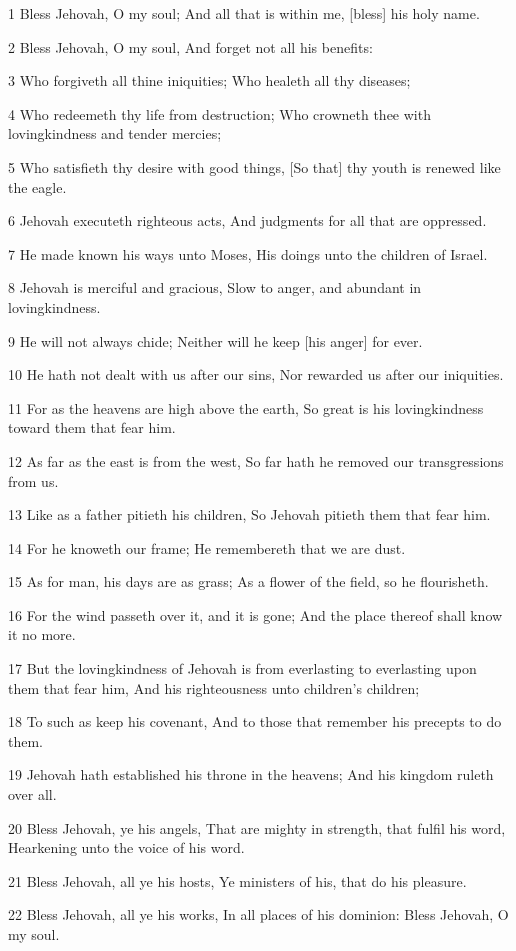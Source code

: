 \par 1 Bless Jehovah, O my soul; And all that is within me, [bless] his holy name.
\par 2 Bless Jehovah, O my soul, And forget not all his benefits:
\par 3 Who forgiveth all thine iniquities; Who healeth all thy diseases;
\par 4 Who redeemeth thy life from destruction; Who crowneth thee with lovingkindness and tender mercies;
\par 5 Who satisfieth thy desire with good things, [So that] thy youth is renewed like the eagle.
\par 6 Jehovah executeth righteous acts, And judgments for all that are oppressed.
\par 7 He made known his ways unto Moses, His doings unto the children of Israel.
\par 8 Jehovah is merciful and gracious, Slow to anger, and abundant in lovingkindness.
\par 9 He will not always chide; Neither will he keep [his anger] for ever.
\par 10 He hath not dealt with us after our sins, Nor rewarded us after our iniquities.
\par 11 For as the heavens are high above the earth, So great is his lovingkindness toward them that fear him.
\par 12 As far as the east is from the west, So far hath he removed our transgressions from us.
\par 13 Like as a father pitieth his children, So Jehovah pitieth them that fear him.
\par 14 For he knoweth our frame; He remembereth that we are dust.
\par 15 As for man, his days are as grass; As a flower of the field, so he flourisheth.
\par 16 For the wind passeth over it, and it is gone; And the place thereof shall know it no more.
\par 17 But the lovingkindness of Jehovah is from everlasting to everlasting upon them that fear him, And his righteousness unto children's children;
\par 18 To such as keep his covenant, And to those that remember his precepts to do them.
\par 19 Jehovah hath established his throne in the heavens; And his kingdom ruleth over all.
\par 20 Bless Jehovah, ye his angels, That are mighty in strength, that fulfil his word, Hearkening unto the voice of his word.
\par 21 Bless Jehovah, all ye his hosts, Ye ministers of his, that do his pleasure.
\par 22 Bless Jehovah, all ye his works, In all places of his dominion: Bless Jehovah, O my soul.

